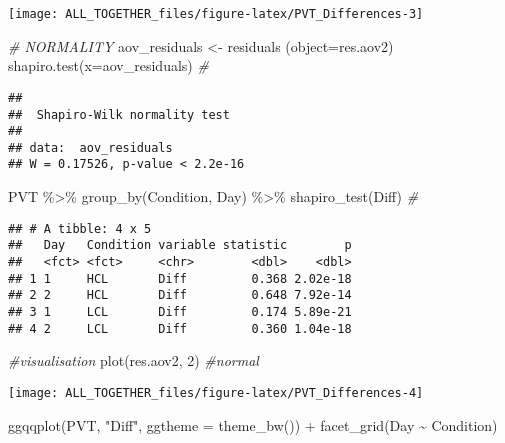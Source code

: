 \documentclass[
]{article}
\newenvironment{Shaded}{\begin{snugshade}}{\end{snugshade}}
\newcommand{\AttributeTok}[1]{\textcolor[rgb]{0.77,0.63,0.00}{#1}}
\newcommand{\CommentTok}[1]{\textcolor[rgb]{0.56,0.35,0.01}{\textit{#1}}}
\newcommand{\DecValTok}[1]{\textcolor[rgb]{0.00,0.00,0.81}{#1}}
\newcommand{\FunctionTok}[1]{\textcolor[rgb]{0.00,0.00,0.00}{#1}}
\newcommand{\NormalTok}[1]{#1}
\newcommand{\OtherTok}[1]{\textcolor[rgb]{0.56,0.35,0.01}{#1}}
\newcommand{\SpecialCharTok}[1]{\textcolor[rgb]{0.00,0.00,0.00}{#1}}
\newcommand{\StringTok}[1]{\textcolor[rgb]{0.31,0.60,0.02}{#1}}
\begin{document}
\texttt{[image: ALL\_TOGETHER\_files/figure-latex/PVT\_Differences-3]}

\begin{Shaded}
\begin{Highlighting}[]
\CommentTok{\# NORMALITY}
\NormalTok{aov\_residuals }\OtherTok{\textless{}{-}} \FunctionTok{residuals}\NormalTok{ (}\AttributeTok{object=}\NormalTok{res.aov2)}
\FunctionTok{shapiro.test}\NormalTok{(}\AttributeTok{x=}\NormalTok{aov\_residuals) }\CommentTok{\#}
\end{Highlighting}
\end{Shaded}

\begin{verbatim}
## 
##  Shapiro-Wilk normality test
## 
## data:  aov_residuals
## W = 0.17526, p-value < 2.2e-16
\end{verbatim}

\begin{Shaded}
\begin{Highlighting}[]
\NormalTok{PVT }\SpecialCharTok{\%\textgreater{}\%}
  \FunctionTok{group\_by}\NormalTok{(Condition, Day) }\SpecialCharTok{\%\textgreater{}\%}
  \FunctionTok{shapiro\_test}\NormalTok{(Diff) }\CommentTok{\#}
\end{Highlighting}
\end{Shaded}

\begin{verbatim}
## # A tibble: 4 x 5
##   Day   Condition variable statistic        p
##   <fct> <fct>     <chr>        <dbl>    <dbl>
## 1 1     HCL       Diff         0.368 2.02e-18
## 2 2     HCL       Diff         0.648 7.92e-14
## 3 1     LCL       Diff         0.174 5.89e-21
## 4 2     LCL       Diff         0.360 1.04e-18
\end{verbatim}

\begin{Shaded}
\begin{Highlighting}[]
\CommentTok{\#visualisation}
\FunctionTok{plot}\NormalTok{(res.aov2, }\DecValTok{2}\NormalTok{) }\CommentTok{\#normal}
\end{Highlighting}
\end{Shaded}

\texttt{[image: ALL\_TOGETHER\_files/figure-latex/PVT\_Differences-4]}

\begin{Shaded}
\begin{Highlighting}[]
\FunctionTok{ggqqplot}\NormalTok{(PVT, }\StringTok{"Diff"}\NormalTok{, }\AttributeTok{ggtheme =} \FunctionTok{theme\_bw}\NormalTok{()) }\SpecialCharTok{+}
  \FunctionTok{facet\_grid}\NormalTok{(Day }\SpecialCharTok{\textasciitilde{}}\NormalTok{ Condition)}
\end{Highlighting}
\end{Shaded}
\end{document}
